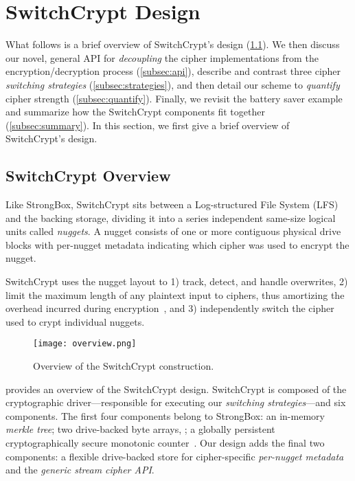 \section{SwitchCrypt Design} \label{sec:design}

What follows is a brief overview of SwitchCrypt's design
(\cref{subsec:overview}). We then discuss our novel, general API for
\emph{decoupling} the cipher implementations from the encryption/decryption
process (\cref{subsec:api}), describe and contrast three cipher \emph{switching
strategies} (\cref{subsec:strategies}), and then detail our scheme to
\emph{quantify} cipher strength (\cref{subsec:quantify}). Finally, we revisit
the battery saver example and summarize how the SwitchCrypt components fit
together (\cref{subsec:summary}). In this section, we first give a brief
overview of SwitchCrypt's design.

\subsection{SwitchCrypt Overview} \label{subsec:overview}

Like StrongBox, SwitchCrypt sits between a Log-structured File System (LFS) and
the backing storage, dividing it into a series independent same-size logical
units called \emph{nuggets}. A nugget consists of one or more contiguous
physical drive blocks with per-nugget metadata indicating which cipher was used
to encrypt the nugget.

SwitchCrypt uses the nugget layout to 1) track, detect, and handle overwrites,
2) limit the maximum length of any plaintext input to ciphers, thus amortizing
the overhead incurred during encryption~\cite{StrongBox}, and 3) independently
switch the cipher used to crypt individual nuggets.


\begin{figure}[ht]
   \centering
   \texttt{[image: overview.png]}
   \caption{Overview of the SwitchCrypt construction.}\label{fig:overview}
\end{figure}

 provides an overview of the SwitchCrypt design. SwitchCrypt is
composed of the cryptographic driver---responsible for executing our
\emph{switching strategies}---and six components. The first four components
belong to StrongBox: an in-memory \emph{merkle tree}; two drive-backed byte
arrays, ; a
globally persistent cryptographically secure monotonic counter~\cite{StrongBox}.
Our design adds the final two components: a flexible drive-backed store for
cipher-specific \emph{per-nugget metadata} and the \emph{generic stream cipher
API}.

